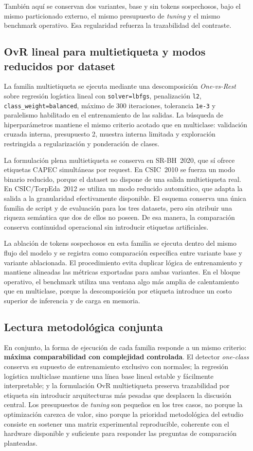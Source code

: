 \documentclass[12pt,oneside]{report}
\begin{document}
También aquí se conservan dos variantes, base y sin tokens sospechosos, bajo el mismo particionado externo, el mismo presupuesto de \textit{tuning} y el mismo benchmark operativo. Esa regularidad refuerza la trazabilidad del contraste.

\subsection{OvR lineal para multietiqueta y modos reducidos por dataset}
La familia multietiqueta se ejecuta mediante una descomposición \textit{One-vs-Rest} sobre regresión logística lineal con \texttt{solver=lbfgs}, penalización \texttt{l2}, \texttt{class\_weight=balanced}, máximo de 300 iteraciones, tolerancia \texttt{1e-3} y paralelismo habilitado en el entrenamiento de las salidas. La búsqueda de hiperparámetros mantiene el mismo criterio acotado que en multiclase: validación cruzada interna, presupuesto 2, muestra interna limitada y exploración restringida a regularización y ponderación de clases.

La formulación plena multietiqueta se conserva en SR-BH~2020, que sí ofrece etiquetas CAPEC simultáneas por request. En CSIC~2010 se fuerza un modo binario reducido, porque el dataset no dispone de una salida multietiqueta real. En CSIC/TorpEda~2012 se utiliza un modo reducido automático, que adapta la salida a la granularidad efectivamente disponible. El esquema conserva una única familia de script y de evaluación para los tres datasets, pero sin atribuir una riqueza semántica que dos de ellos no poseen. De esa manera, la comparación conserva continuidad operacional sin introducir etiquetas artificiales.

La ablación de tokens sospechosos en esta familia se ejecuta dentro del mismo flujo del modelo y se registra como comparación específica entre variante base y variante ablacionada. El procedimiento evita duplicar lógica de entrenamiento y mantiene alineadas las métricas exportadas para ambas variantes. En el bloque operativo, el benchmark utiliza una ventana algo más amplia de calentamiento que en multiclase, porque la descomposición por etiqueta introduce un costo superior de inferencia y de carga en memoria.

\subsection{Lectura metodológica conjunta}
En conjunto, la forma de ejecución de cada familia responde a un mismo criterio: \textbf{máxima comparabilidad con complejidad controlada}. El detector \textit{one-class} conserva su supuesto de entrenamiento exclusivo con normales; la regresión logística multiclase mantiene una línea base lineal estable y fácilmente interpretable; y la formulación OvR multietiqueta preserva trazabilidad por etiqueta sin introducir arquitecturas más pesadas que desplacen la discusión central. Los presupuestos de \textit{tuning} son pequeños en los tres casos, no porque la optimización carezca de valor, sino porque la prioridad metodológica del estudio consiste en sostener una matriz experimental reproducible, coherente con el hardware disponible y suficiente para responder las preguntas de comparación planteadas.
\end{document}
